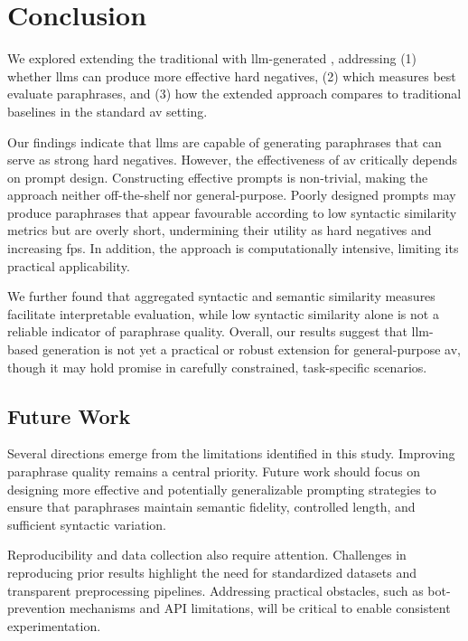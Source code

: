 \chapter{Conclusion}
\label{chap:conclusion}

We explored extending the traditional \impAppr{} with \ac{llm}-generated \imps{}, addressing (1) whether \acp{llm} can produce more effective hard negatives, (2) which measures best evaluate paraphrases, and (3) how the extended approach compares to traditional baselines in the standard \ac{av} setting.

Our findings indicate that \acp{llm} are capable of generating paraphrases that can serve as strong hard negatives. 
However, the effectiveness of \ac{av} critically depends on prompt design. 
Constructing effective prompts is non-trivial, making the approach neither off-the-shelf nor general-purpose. 
Poorly designed prompts may produce paraphrases that appear favourable according to low syntactic similarity metrics but are overly short, undermining their utility as hard negatives and increasing \acp{fp}. 
In addition, the approach is computationally intensive, limiting its practical applicability.  

We further found that aggregated syntactic and semantic similarity measures facilitate interpretable evaluation, while low syntactic similarity alone is not a reliable indicator of paraphrase quality. 
Overall, our results suggest that \ac{llm}-based \imp{} generation is not yet a practical or robust extension for general-purpose \ac{av}, though it may hold promise in carefully constrained, task-specific scenarios.  



\section{Future Work}

Several directions emerge from the limitations identified in this study. 
Improving paraphrase quality remains a central priority. 
Future work should focus on designing more effective and potentially generalizable prompting strategies to ensure that paraphrases maintain semantic fidelity, controlled length, and sufficient syntactic variation.  

Reproducibility and data collection also require attention. 
Challenges in reproducing prior results highlight the need for standardized datasets and transparent preprocessing pipelines. 
Addressing practical obstacles, such as bot-prevention mechanisms and API limitations, will be critical to enable consistent experimentation.  

